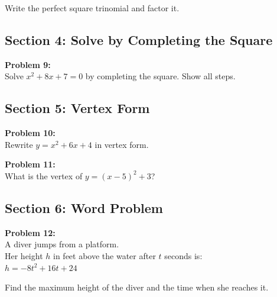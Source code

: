 \documentclass[12pt]{article}
\begin{document}
			\vspace{3cm}

			Write the perfect square trinomial and factor it.

			\vspace{5cm}

		\subsection*{Section 4: Solve by Completing the Square}

			\textbf{Problem 9:}\\

			Solve $x^2 + 8x + 7 = 0$ by completing the square. Show all steps.

			\newpage

		\subsection*{Section 5: Vertex Form}

			\textbf{Problem 10:}\\

			Rewrite $y = x^2 + 6x + 4$ in vertex form.

			\vspace{7cm}

			\textbf{Problem 11:}\\

			What is the vertex of $y = (x - 5)^2 + 3$?

			\newpage

		\subsection*{Section 6: Word Problem}

			\textbf{Problem 12:}\\

			A diver jumps from a platform.\\

			Her height $h$ in feet above the water after $t$ seconds is:\\

			$h = -8t^2 + 16t + 24$

			\vspace{0.5cm}

			Find the maximum height of the diver and the time when she reaches it.

			\newpage
\end{document}
